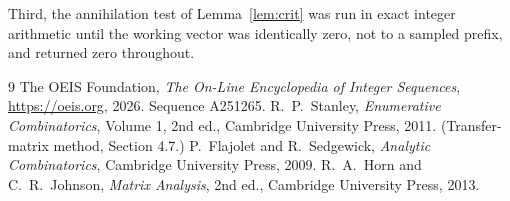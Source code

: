 \documentclass[11pt,a4paper]{article}
\theoremstyle{plain}
\theoremstyle{definition}
\begin{document}
Third, the annihilation test of Lemma~\ref{lem:crit} was run in exact integer arithmetic
until the working vector was identically zero, not to a sampled prefix, and returned zero
throughout.

\begin{thebibliography}{9}
 The OEIS Foundation, \emph{The On-Line Encyclopedia of Integer
Sequences}, \url{https://oeis.org}, 2026. Sequence A251265.
 R.~P.~Stanley, \emph{Enumerative Combinatorics}, Volume 1, 2nd ed.,
Cambridge University Press, 2011. (Transfer-matrix method, Section 4.7.)
 P.~Flajolet and R.~Sedgewick, \emph{Analytic Combinatorics}, Cambridge
University Press, 2009.
 R.~A.~Horn and C.~R.~Johnson, \emph{Matrix Analysis}, 2nd ed., Cambridge
University Press, 2013.
\end{thebibliography}
\end{document}
